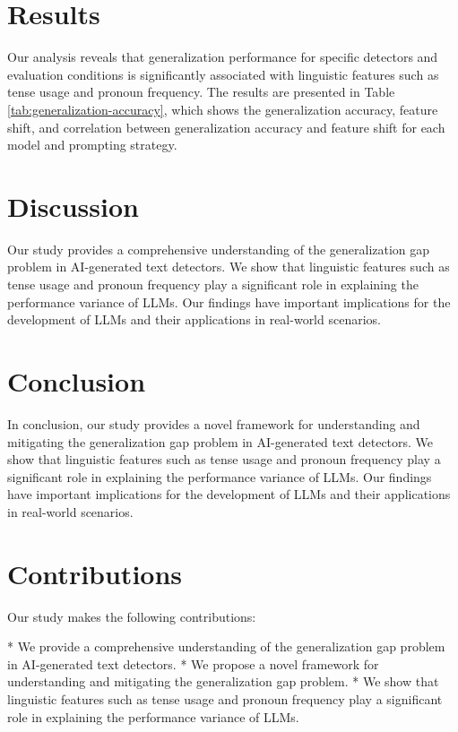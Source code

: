 \documentclass{article}
\begin{document}
\section{Results}

Our analysis reveals that generalization performance for specific detectors and evaluation conditions is significantly associated with linguistic features such as tense usage and pronoun frequency. The results are presented in Table \ref{tab:generalization-accuracy}, which shows the generalization accuracy, feature shift, and correlation between generalization accuracy and feature shift for each model and prompting strategy.

\section{Discussion}

Our study provides a comprehensive understanding of the generalization gap problem in AI-generated text detectors. We show that linguistic features such as tense usage and pronoun frequency play a significant role in explaining the performance variance of LLMs. Our findings have important implications for the development of LLMs and their applications in real-world scenarios.

\section{Conclusion}

In conclusion, our study provides a novel framework for understanding and mitigating the generalization gap problem in AI-generated text detectors. We show that linguistic features such as tense usage and pronoun frequency play a significant role in explaining the performance variance of LLMs. Our findings have important implications for the development of LLMs and their applications in real-world scenarios.

\section{Contributions}

Our study makes the following contributions:

* We provide a comprehensive understanding of the generalization gap problem in AI-generated text detectors.
* We propose a novel framework for understanding and mitigating the generalization gap problem.
* We show that linguistic features such as tense usage and pronoun frequency play a significant role in explaining the performance variance of LLMs.
\end{document}
